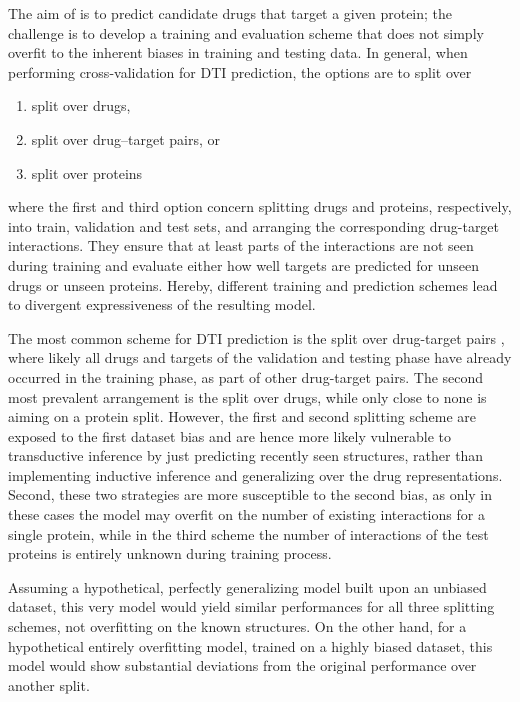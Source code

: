 \documentclass{bioinfo}
\begin{document}

The aim of \name is to predict candidate drugs that target a given
protein; the challenge is to develop a training and evaluation scheme
that does not simply overfit to the inherent biases in training and
testing data.
In general, when performing cross-validation for DTI prediction, the
options are to split over 
\begin{enumerate}
	\item split over drugs,
	\item split over drug--target pairs, or
	\item split over proteins
\end{enumerate}
where the first and third option concern splitting drugs and proteins,
respectively, into train, validation and test sets, and arranging the
corresponding drug-target interactions. They ensure that at least
parts of the interactions are not seen during training and evaluate
either how well targets are predicted for unseen drugs or unseen
proteins. Hereby, different training and prediction schemes lead to
divergent expressiveness of the resulting model.

 The most common scheme for DTI
prediction is the split over drug-target pairs \citep{Survey2018},
where likely all drugs and targets of the validation and testing phase
have already occurred in the training phase, as part of other
drug-target pairs. The second most prevalent arrangement is the split
over drugs, while only close to none is aiming on a protein split.
However, the first and second splitting scheme are exposed to the
first dataset bias and are hence more likely vulnerable to
transductive inference by just predicting recently seen structures,
rather than implementing inductive inference and generalizing over the
drug representations. Second, these two strategies are more
susceptible to the second bias, as only in these cases the model may
overfit on the number of existing interactions for a single protein,
while in the third scheme the number of interactions of the test
proteins is entirely unknown during training process.

Assuming a hypothetical, perfectly generalizing model built upon an
unbiased dataset, this very model would yield similar performances for
all three splitting schemes, not overfitting on the known
structures. On the other hand, for a hypothetical entirely overfitting
model, trained on a highly biased dataset, this model would show
substantial deviations from the original performance over another
split.
\end{document}
